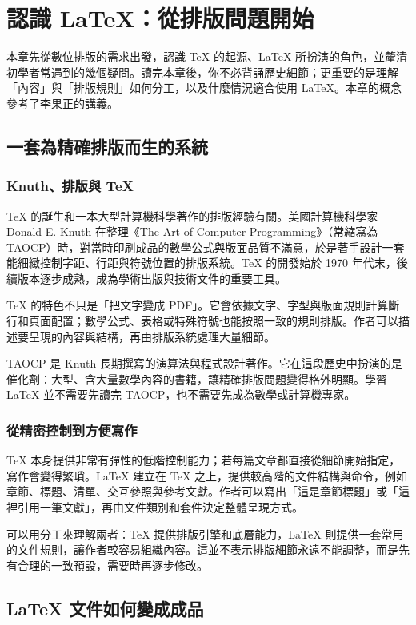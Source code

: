 \chapter{認識 LaTeX：從排版問題開始}

本章先從數位排版的需求出發，認識 TeX 的起源、LaTeX 所扮演的角色，並釐清初學者常遇到的幾個疑問。讀完本章後，你不必背誦歷史細節；更重要的是理解「內容」與「排版規則」如何分工，以及什麼情況適合使用 LaTeX。本章的概念參考了李果正的講義\cite{lee2004}。

\section{一套為精確排版而生的系統}

\subsection{Knuth、排版與 TeX}

TeX 的誕生和一本大型計算機科學著作的排版經驗有關。美國計算機科學家 Donald E. Knuth 在整理《The Art of Computer Programming》（常縮寫為 TAOCP）時，對當時印刷成品的數學公式與版面品質不滿意，於是著手設計一套能細緻控制字距、行距與符號位置的排版系統。TeX 的開發始於 1970 年代末，後續版本逐步成熟，成為學術出版與技術文件的重要工具。

TeX 的特色不只是「把文字變成 PDF」。它會依據文字、字型與版面規則計算斷行和頁面配置；數學公式、表格或特殊符號也能按照一致的規則排版。作者可以描述要呈現的內容與結構，再由排版系統處理大量細節。

TAOCP 是 Knuth 長期撰寫的演算法與程式設計著作。它在這段歷史中扮演的是催化劑：大型、含大量數學內容的書籍，讓精確排版問題變得格外明顯。學習 LaTeX 並不需要先讀完 TAOCP，也不需要先成為數學或計算機專家。

\subsection{從精密控制到方便寫作}

TeX 本身提供非常有彈性的低階控制能力；若每篇文章都直接從細節開始指定，寫作會變得繁瑣。LaTeX 建立在 TeX 之上，提供較高階的文件結構與命令，例如章節、標題、清單、交互參照與參考文獻。作者可以寫出「這是章節標題」或「這裡引用一筆文獻」，再由文件類別和套件決定整體呈現方式。

可以用分工來理解兩者：TeX 提供排版引擎和底層能力，LaTeX 則提供一套常用的文件規則，讓作者較容易組織內容。這並不表示排版細節永遠不能調整，而是先有合理的一致預設，需要時再逐步修改。

\section{LaTeX 文件如何變成成品}

